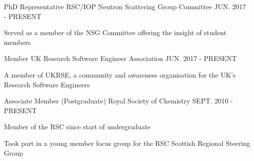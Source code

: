 \begin{cventries}
  \cventry
  	{PhD Representative}
    {RSC/IOP Neutron Scattering Group Committee}
    {}
    {JUN. 2017 - PRESENT}
    {
      \begin{cvitems}
      	\item {Served as a member of the NSG Committee offering the insight of student members}
	  \end{cvitems}
	}
  \cventry
    {Member}
    {UK Research Software Engineer Association}
    {}
    {JUN. 2017 - PRESENT}
    {
	  \begin{cvitems}
	  	\item{A member of UKRSE, a community and awareness organisation for the UK's Research Software Engineers}
	  \end{cvitems}
    }
  \cventry
    {Associate Member (Postgraduate)}
    {Royal Society of Chemistry}
    {}
    {SEPT. 2010 - PRESENT}
    {
      \begin{cvitems}
      	\item {Member of the RSC since start of undergraduate}
        \item {Took part in a young member focus group for the RSC Scottish Regional Steering Group}
      \end{cvitems}
    }
\end{cventries}
